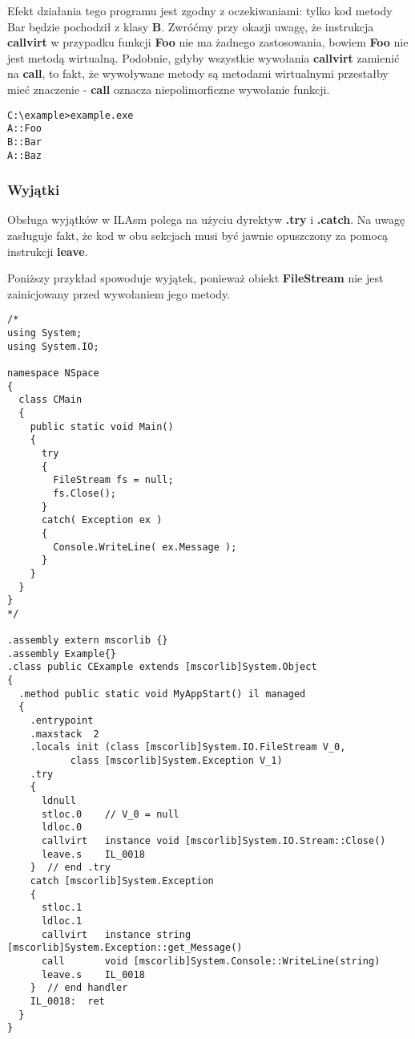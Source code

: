Efekt działania tego programu jest zgodny z oczekiwaniami: tylko kod metody Bar będzie pochodził
z klasy {\bf B}. Zwróćmy przy okazji uwagę, że instrukcja {\bf callvirt} w przypadku funkcji {\bf Foo} nie
ma żadnego zastosowania, bowiem {\bf Foo} nie jest metodą wirtualną. Podobnie, gdyby wszystkie wywołania
{\bf callvirt} zamienić na {\bf call}, to fakt, że wywoływane metody są metodami wirtualnymi przestałby
mieć znaczenie - {\bf call} oznacza niepolimorficzne wywołanie funkcji.

\begin{scriptsize}
\begin{verbatim}
C:\example>example.exe
A::Foo
B::Bar
A::Baz
\end{verbatim}
\end{scriptsize}

\subsubsection{Wyjątki}

Obsługa wyjątków w ILAsm polega na użyciu dyrektyw {\bf .try} i {\bf .catch}. Na uwagę zasługuje 
fakt, że kod w obu sekcjach musi być jawnie opuszczony za pomocą instrukcji {\bf leave}.

Poniższy przykład spowoduje wyjątek, ponieważ obiekt {\bf FileStream} nie jest zainicjowany przed
wywołaniem jego metody.

\begin{scriptsize}
\begin{verbatim}
/*
using System;
using System.IO;

namespace NSpace
{ 
  class CMain
  {
    public static void Main()
    {
      try
      {
        FileStream fs = null;
        fs.Close();
      }
      catch( Exception ex )
      {
        Console.WriteLine( ex.Message );
      }
    }
  } 
}
*/

.assembly extern mscorlib {}
.assembly Example{} 
.class public CExample extends [mscorlib]System.Object
{ 
  .method public static void MyAppStart() il managed 
  { 
    .entrypoint 
    .maxstack  2
    .locals init (class [mscorlib]System.IO.FileStream V_0,
           class [mscorlib]System.Exception V_1)  
    .try
    {
      ldnull     
      stloc.0    // V_0 = null
      ldloc.0
      callvirt   instance void [mscorlib]System.IO.Stream::Close()
      leave.s    IL_0018
    }  // end .try
    catch [mscorlib]System.Exception 
    {
      stloc.1
      ldloc.1
      callvirt   instance string [mscorlib]System.Exception::get_Message()
      call       void [mscorlib]System.Console::WriteLine(string)
      leave.s    IL_0018
    }  // end handler
    IL_0018:  ret
  } 
}
\end{verbatim}
\end{scriptsize}

